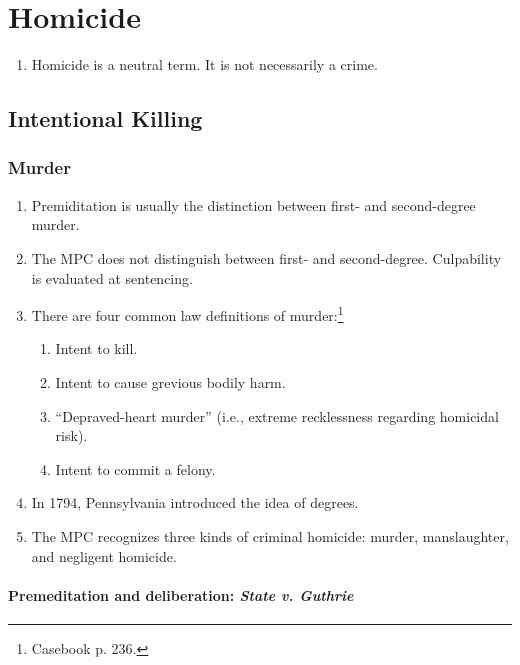 \section{Homicide}

\begin{enumerate}
    \item Homicide is a neutral term. It is not necessarily a crime.
\end{enumerate}

\subsection{Intentional Killing}

\subsubsection{Murder}

\begin{enumerate}
    \item Premiditation is usually the distinction between first- and second-degree murder.
    \item The MPC does not distinguish between first- and second-degree. Culpability is evaluated at sentencing.
    \item There are four common law definitions of murder:\footnote{Casebook p. 236.}
    \begin{enumerate}
        \item Intent to kill.
        \item Intent to cause grevious bodily harm.
        \item ``Depraved-heart murder'' (i.e., extreme recklessness regarding homicidal risk).
        \item Intent to commit a felony.
    \end{enumerate}
    \item In 1794, Pennsylvania introduced the idea of degrees.
    \item The MPC recognizes three kinds of criminal homicide: murder, manslaughter, and negligent homicide.
\end{enumerate}

\paragraph{Premeditation and deliberation: \emph{State v. Guthrie}}

